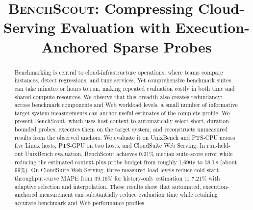 \documentclass[sigconf, review, anonymous, balance=false]{acmart}
\newcommand{\ourmethod}{\textsc{BenchScout}\xspace}
\begin{document}
\title[\ourmethod]{\ourmethod: Compressing Cloud-Serving Evaluation with Execution-Anchored Sparse Probes}



\renewcommand{\shortauthors}{Anonymous Author(s)}

\begin{abstract}
Benchmarking is central to cloud-infrastructure operations, where teams compare instances, detect regressions, and tune services. Yet comprehensive benchmark suites can take minutes or hours to run, making repeated evaluation costly in both time and shared compute resources. We observe that this breadth also creates redundancy: across benchmark components and Web workload levels, a small number of informative target-system measurements can anchor useful estimates of the complete profile. We present BenchScout, which uses host context to automatically select short, duration-bounded probes, executes them on the target system, and reconstructs unmeasured results from the observed anchors. We evaluate it on UnixBench and PTS-CPU across five Linux hosts, PTS-GPU on two hosts, and CloudSuite Web Serving. In run-held-out UnixBench evaluation, BenchScout achieves 0.21\% median suite-score error while reducing the estimated context-plus-probe budget from roughly 1,690\,s to 18.1\,s (about 99\%). On CloudSuite Web Serving, three measured load levels reduce cold-start throughput-curve MAPE from 39.16\% for history-only estimation to 7.21\% with adaptive selection and interpolation. These results show that automated, execution-anchored measurement can substantially reduce evaluation time while retaining accurate benchmark and Web performance profiles.

\end{abstract}
\end{document}
